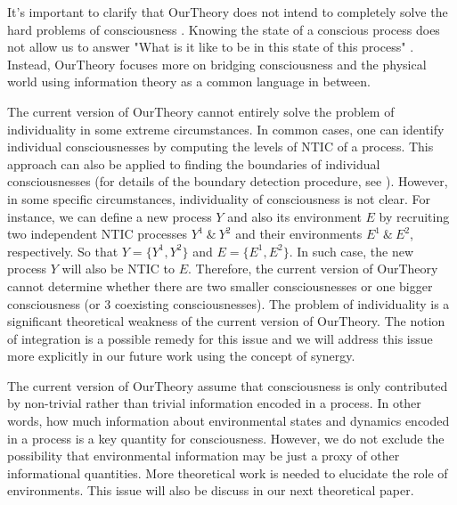\documentclass[utf8]{article}
\begin{document}
        
        It's important to clarify that \ac{OurTheory} does not intend to completely solve the hard problems of consciousness \citep{chalmers1995facing}. Knowing the state of a conscious process does not allow us to answer "What is it like to be in this state of this process" \citep{nagel1974like}. Instead, \ac{OurTheory} focuses more on bridging consciousness and the physical world using information theory as a common language in between.
        
        The current version of \ac{OurTheory} cannot entirely solve the problem of individuality in some extreme circumstances. In common cases, one can identify individual consciousnesses by computing the levels of NTIC of a process. This approach can also be applied to finding the boundaries of individual consciousnesses (for details of the boundary detection procedure, see \cite{krakauer2014information}). However, in some specific circumstances, individuality of consciousness is not clear. For instance, we can define a new process $Y$ and also its environment $E$ by recruiting two independent NTIC processes $Y^1~\&~Y^2$ and their environments $E^1~\&~E^2$, respectively. So that $Y = \{Y^1,Y^2\}$ and $E=\{E^1,E^2\}$. In such case, the new process $Y$ will also be NTIC to $E$. Therefore, the current version of \ac{OurTheory} cannot determine whether there are two smaller consciousnesses or one bigger consciousness (or 3 coexisting consciousnesses). The problem of individuality is a significant theoretical weakness of the current version of \ac{OurTheory}. The notion of integration is a possible remedy for this issue and we will address this issue more explicitly in our future work using the concept of synergy.
        
        The current version of \ac{OurTheory} assume that consciousness is only contributed by non-trivial rather than trivial information encoded in a process. In other words, how much information about environmental states and dynamics encoded in a process is a key quantity for consciousness. However, we do not exclude the possibility that environmental information may be just a proxy of other informational quantities. More theoretical work is needed to elucidate the role of environments. This issue will also be discuss in our next theoretical paper. 
        
\end{document}
